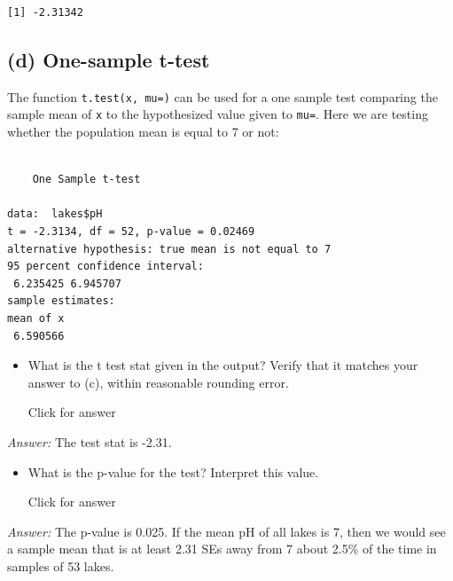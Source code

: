 \documentclass[
]{book}
\newenvironment{Shaded}{\begin{snugshade}}{\end{snugshade}}
\newcommand{\AttributeTok}[1]{\textcolor[rgb]{0.77,0.63,0.00}{#1}}
\newcommand{\DecValTok}[1]{\textcolor[rgb]{0.00,0.00,0.81}{#1}}
\newcommand{\FunctionTok}[1]{\textcolor[rgb]{0.00,0.00,0.00}{#1}}
\newcommand{\NormalTok}[1]{#1}
\newcommand{\SpecialCharTok}[1]{\textcolor[rgb]{0.00,0.00,0.00}{#1}}
\providecommand{\tightlist}{%
  \setlength{\itemsep}{0pt}\setlength{\parskip}{0pt}}
\begin{document}
\begin{verbatim}
[1] -2.31342
\end{verbatim}

\hypertarget{d-one-sample-t-test}{%
\subsection{(d) One-sample t-test}\label{d-one-sample-t-test}}

The function \texttt{t.test(x,\ mu=)} can be used for a one sample test comparing the sample mean of \texttt{x} to the hypothesized value given to \texttt{mu=}. Here we are testing whether the population mean is equal to 7 or not:

\begin{Shaded}
\end{Shaded}

\begin{verbatim}

    One Sample t-test

data:  lakes$pH
t = -2.3134, df = 52, p-value = 0.02469
alternative hypothesis: true mean is not equal to 7
95 percent confidence interval:
 6.235425 6.945707
sample estimates:
mean of x 
 6.590566 
\end{verbatim}

\begin{itemize}
\tightlist
\item
  What is the t test stat given in the output? Verify that it matches your answer to (c), within reasonable rounding error.

  Click for answer
\end{itemize}

\emph{Answer:} The test stat is -2.31.

\begin{itemize}
\tightlist
\item
  What is the p-value for the test? Interpret this value.

  Click for answer
\end{itemize}

\emph{Answer:} The p-value is 0.025. If the mean pH of all lakes is 7, then we would see a sample mean that is at least 2.31 SEs away from 7 about 2.5\% of the time in samples of 53 lakes.
\end{document}
